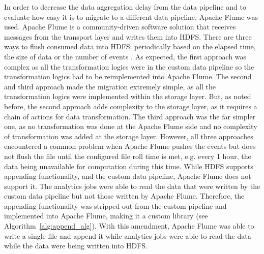 In order to decrease the data aggregation delay from the data pipeline and to evaluate how easy it is to migrate to a different data pipeline, Apache Flume was used. Apache Flume is a community-driven software solution that receives messages from the transport layer and writes them into HDFS. There are three ways to flush consumed data into HDFS: periodically based on the elapsed time, the size of data or the number of events \cite{Flume16}. As expected, the first approach was complex as all the transformation logics were in the custom data pipeline so the transformation logics had to be reimplemented into Apache Flume. The second and third approach made the migration extremely simple, as all the transformation logics were implemented within the storage layer. But, as noted before, the second approach adds complexity to the storage layer, as it requires a chain of actions for data transformation. The third approach was the far simpler one, as no transformation was done at the Apache Flume side and no complexity of transformation was added at the storage layer. However, all three approaches encountered a common problem when Apache Flume pushes the events but does not flush the file until the configured file roll time is met, e.g. every 1 hour, the data being unavailable for computation during this time. While HDFS supports appending functionality, and the custom data pipeline, Apache Flume does not support it. The analytics jobs were able to read the data that were written by the custom data pipeline but not those written by Apache Flume. Therefore, the appending functionality was stripped out from the custom pipeline and implemented into Apache Flume, making it a custom library (see Algorithm~\ref{alg:append_alg}). With this amendment, Apache Flume was able to write a single file and append it while analytics jobs were able to read the data while the data were being written into HDFS.



\makeatletter
\def\BState{\State\hskip-\ALG@thistlm}
\makeatother


